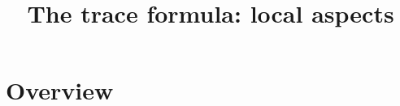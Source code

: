 

%


\title{The trace formula: local aspects}


\maketitle

\label{section-phantom}


\tableofcontents


\section{Overview}
\label{section-overview}

\noindent









